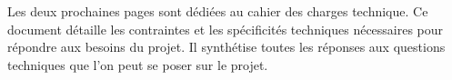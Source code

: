 Les deux prochaines pages sont dédiées au cahier des charges technique.
Ce document détaille les contraintes et les spécificités techniques nécessaires pour répondre aux besoins du projet.
Il synthétise toutes les réponses aux questions techniques que l'on peut se poser sur le projet.


